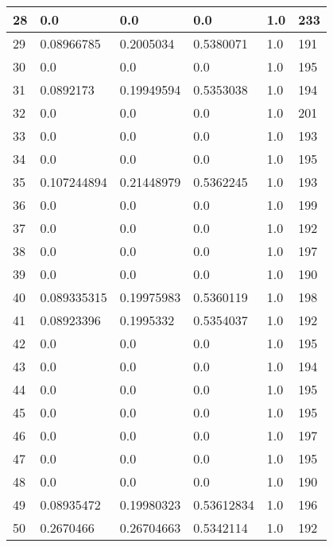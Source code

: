 \begin{longtable}{|l|l|l|l|l|l|}
28 & 0.0 & 0.0 & 0.0 & 1.0 & 233 \\ \hline 
29 & 0.08966785 & 0.2005034 & 0.5380071 & 1.0 & 191 \\ \hline 
30 & 0.0 & 0.0 & 0.0 & 1.0 & 195 \\ \hline 
31 & 0.0892173 & 0.19949594 & 0.5353038 & 1.0 & 194 \\ \hline 
32 & 0.0 & 0.0 & 0.0 & 1.0 & 201 \\ \hline 
33 & 0.0 & 0.0 & 0.0 & 1.0 & 193 \\ \hline 
34 & 0.0 & 0.0 & 0.0 & 1.0 & 195 \\ \hline 
35 & 0.107244894 & 0.21448979 & 0.5362245 & 1.0 & 193 \\ \hline 
36 & 0.0 & 0.0 & 0.0 & 1.0 & 199 \\ \hline 
37 & 0.0 & 0.0 & 0.0 & 1.0 & 192 \\ \hline 
38 & 0.0 & 0.0 & 0.0 & 1.0 & 197 \\ \hline 
39 & 0.0 & 0.0 & 0.0 & 1.0 & 190 \\ \hline 
40 & 0.089335315 & 0.19975983 & 0.5360119 & 1.0 & 198 \\ \hline 
41 & 0.08923396 & 0.1995332 & 0.5354037 & 1.0 & 192 \\ \hline 
42 & 0.0 & 0.0 & 0.0 & 1.0 & 195 \\ \hline 
43 & 0.0 & 0.0 & 0.0 & 1.0 & 194 \\ \hline 
44 & 0.0 & 0.0 & 0.0 & 1.0 & 195 \\ \hline 
45 & 0.0 & 0.0 & 0.0 & 1.0 & 195 \\ \hline 
46 & 0.0 & 0.0 & 0.0 & 1.0 & 197 \\ \hline 
47 & 0.0 & 0.0 & 0.0 & 1.0 & 195 \\ \hline 
48 & 0.0 & 0.0 & 0.0 & 1.0 & 190 \\ \hline 
49 & 0.08935472 & 0.19980323 & 0.53612834 & 1.0 & 196 \\ \hline 
50 & 0.2670466 & 0.26704663 & 0.5342114 & 1.0 & 192 \\ \hline 
\end{longtable}